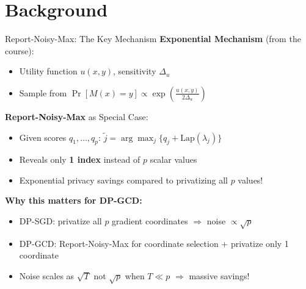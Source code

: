 \documentclass{beamer}
\begin{document}
\section{Background}

\begin{frame}{Report-Noisy-Max: The Key Mechanism}
\textbf{Exponential Mechanism} (from the course):
\begin{itemize}
\item Utility function $u(x, y)$, sensitivity $\Delta_u$
\item Sample from $\Pr[M(x) = y] \propto \exp\left( \frac{u(x,y)}{2\Delta_u} \right)$
\end{itemize}

\vspace{0.8em}

\textbf{Report-Noisy-Max} as Special Case:
\begin{itemize}
\item Given scores $q_1, \ldots, q_p$: $\tilde{j} = \arg\max_j \{ q_j + \mathrm{Lap}(\lambda_j) \}$
\item Reveals only \textbf{1 index} instead of $p$ scalar values
\item \alert{Exponential privacy savings} compared to privatizing all $p$ values!
\end{itemize}

\vspace{0.8em}

\textbf{Why this matters for DP-GCD:}
\begin{itemize}
\item DP-SGD: privatize all $p$ gradient coordinates $\Rightarrow$ noise $\propto \sqrt{p}$
\item DP-GCD: Report-Noisy-Max for coordinate selection + privatize only 1 coordinate
\item Noise scales as $\sqrt{T}$ not $\sqrt{p}$ when $T \ll p$ $\Rightarrow$ massive savings!
\end{itemize}
\end{frame}
\end{document}
